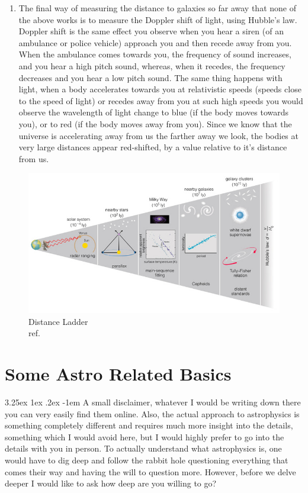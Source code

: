 \documentclass[a4paper,twoside,11pt]{article}
\makeatletter
\numberwithin{equation}{section}
\renewcommand\paragraph{\@startsection{paragraph}{5}{\z@}%
  {3.25ex \@plus1ex \@minus.2ex}%
  {-1em}%
  {\normalfont\normalsize\bfseries}}
\makeatother
\begin{document}
\begin{enumerate}
\begin{enumerate}
    \end{enumerate}
    \item The final way of measuring the distance to galaxies so far away that none of the above works is to measure the Doppler shift of light, using Hubble's law. Doppler shift is the same effect you observe when you hear a siren (of an ambulance or police vehicle) approach you and then recede away from you. When the ambulance comes towards you, the frequency of sound increases, and you hear a high pitch sound, whereas, when it recedes, the frequency decreases and you hear a low pitch sound. The same thing happens with light, when a body accelerates towards you at relativistic speeds (speeds close to the speed of light) or recedes away from you at such high speeds you would observe the wavelength of light change to blue (if the body moves towards you), or to red (if the body moves away from you). Since we know that the universe is accelerating away from us the farther away we look, the bodies at very large distances appear red-shifted, by a value relative to it's distance from us. 
\end{enumerate}
\begin{figure}[h]
    \begin{center}
        \includegraphics[width=0.8\linewidth]{fig12.jpg} 
        \caption{Distance Ladder \\ ref. \cite{DistLadder2}}
        \label{fig12}
    \end{center}
\end{figure}

\newpage
\section{Some Astro Related Basics}
\paragraph{}
A small disclaimer, whatever I would be writing down there you can very easily find them online. Also, the actual approach to astrophysics is something completely different and requires much more insight into the details, something which I would avoid here, but I would highly prefer to go into the details with you in person. To actually understand what astrophysics is, one would have to dig deep and follow the rabbit hole questioning everything that comes their way and having the will to question more. However, before we delve deeper I would like to ask how deep are you willing to go?
\end{document}
